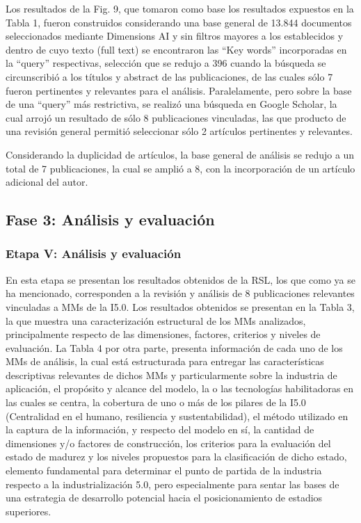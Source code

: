\documentclass{article}
\begin{document}
Los resultados de la Fig. 9, que tomaron como base los resultados
expuestos en la Tabla 1, fueron construidos considerando una base
general de 13.844 documentos seleccionados mediante Dimensions AI y sin
filtros mayores a los establecidos y dentro de cuyo texto (full text) se
encontraron las ``Key words'' incorporadas en la ``query'' respectivas,
selección que se redujo a 396 cuando la búsqueda se circunscribió a los
títulos y abstract de las publicaciones, de las cuales sólo 7 fueron
pertinentes y relevantes para el análisis. Paralelamente, pero sobre la
base de una ``query'' más restrictiva, se realizó una búsqueda en Google
Scholar, la cual arrojó un resultado de sólo 8 publicaciones vinculadas,
las que producto de una revisión general permitió seleccionar sólo 2
artículos pertinentes y relevantes.

Considerando la duplicidad de artículos, la base general de análisis se
redujo a un total de 7 publicaciones, la cual se amplió a 8, con la
incorporación de un artículo adicional del autor.

\subsection{Fase 3: Análisis y
evaluación}\label{fase-3-anuxe1lisis-y-evaluaciuxf3n}

\subsubsection{Etapa V: Análisis y
evaluación}\label{etapa-v-anuxe1lisis-y-evaluaciuxf3n}

En esta etapa se presentan los resultados obtenidos de la RSL, los que
como ya se ha mencionado, corresponden a la revisión y análisis de 8
publicaciones relevantes vinculadas a MMs de la I5.0. Los resultados
obtenidos se presentan en la Tabla 3, la que muestra una caracterización
estructural de los MMs analizados, principalmente respecto de las
dimensiones, factores, criterios y niveles de evaluación. La Tabla 4 por
otra parte, presenta información de cada uno de los MMs de análisis, la
cual está estructurada para entregar las características descriptivas
relevantes de dichos MMs y particularmente sobre la industria de
aplicación, el propósito y alcance del modelo, la o las tecnologías
habilitadoras en las cuales se centra, la cobertura de uno o más de los
pilares de la I5.0 (Centralidad en el humano, resiliencia y
sustentabilidad), el método utilizado en la captura de la información, y
respecto del modelo en sí, la cantidad de dimensiones y/o factores de
construcción, los criterios para la evaluación del estado de madurez y
los niveles propuestos para la clasificación de dicho estado, elemento
fundamental para determinar el punto de partida de la industria respecto
a la industrialización 5.0, pero especialmente para sentar las bases de
una estrategia de desarrollo potencial hacia el posicionamiento de
estadios superiores.
\end{document}
